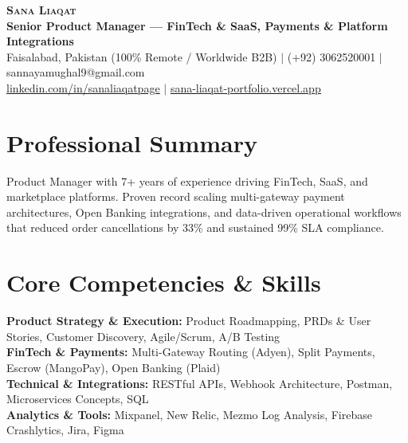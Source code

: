 \documentclass[letterpaper,10pt]{article}
\begin{document}
\begin{center}
    \textbf{\Huge \scshape Sana Liaqat} \\ \vspace{2pt}
    \textbf{\large Senior Product Manager — FinTech \& SaaS, Payments \& Platform Integrations} \\ \vspace{3pt}
    \small Faisalabad, Pakistan (100\% Remote / Worldwide B2B) $|$ (+92) 3062520001 $|$ sannayamughal9@gmail.com \\ \vspace{1pt} 
    \small \href{https://www.linkedin.com/in/sanaliaqatpage/}{\underline{linkedin.com/in/sanaliaqatpage}} $|$ \href{https://sana-liaqat-portfolio.vercel.app/}{\underline{sana-liaqat-portfolio.vercel.app}}
\end{center}

\section{Professional Summary}
\small{
Product Manager with 7+ years of experience driving FinTech, SaaS, and marketplace platforms. Proven record scaling multi-gateway payment architectures, Open Banking integrations, and data-driven operational workflows that reduced order cancellations by 33\% and sustained 99\% SLA compliance.
}

\section{Core Competencies \& Skills}
\begin{itemize}[leftmargin=0.15in, label={}]
    \small{\item{
     \textbf{Product Strategy \& Execution:} Product Roadmapping, PRDs \& User Stories, Customer Discovery, Agile/Scrum, A/B Testing \\
     \textbf{FinTech \& Payments:} Multi-Gateway Routing (Adyen), Split Payments, Escrow (MangoPay), Open Banking (Plaid) \\
     \textbf{Technical \& Integrations:} RESTful APIs, Webhook Architecture, Postman, Microservices Concepts, SQL \\
     \textbf{Analytics \& Tools:} Mixpanel, New Relic, Mezmo Log Analysis, Firebase Crashlytics, Jira, Figma
    }}
\end{itemize}

\end{document}
